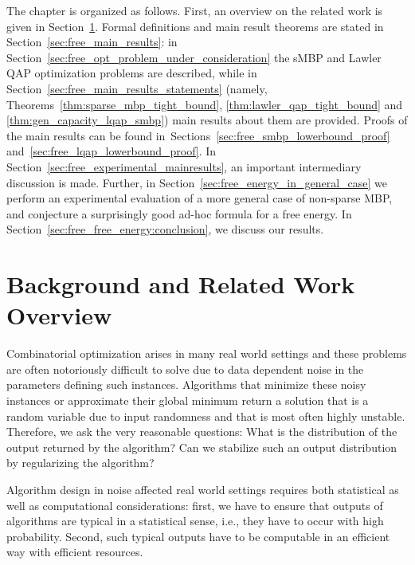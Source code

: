 The chapter is organized as follows. First, an overview on the related work is
given in Section~\ref{sec:free_related_work}. Formal definitions and main result
theorems are stated in Section~\ref{sec:free_main_results}: in
Section~\ref{sec:free_opt_problem_under_consideration} the sMBP and Lawler QAP
optimization problems are described, while in
Section~\ref{sec:free_main_results_statements} (namely,
Theorems~\ref{thm:sparse_mbp_tight_bound}, \ref{thm:lawler_qap_tight_bound} and
\ref{thm:gen_capacity_lqap_smbp}) main results about them are provided. Proofs
of the main results can be found
in~Sections~\ref{sec:free_smbp_lowerbound_proof}
and~\ref{sec:free_lqap_lowerbound_proof}. In
Section~\ref{sec:free_experimental_mainresults}, an important intermediary
discussion is made. Further, in Section~\ref{sec:free_energy_in_general_case} we
perform an experimental evaluation of a more general case of non-sparse MBP, and
conjecture a surprisingly good ad-hoc formula for a free energy. In
Section~\ref{sec:free_free_energy:conclusion}, we discuss our results.

\section{Background and Related Work Overview}
\label{sec:free_related_work}

Combinatorial optimization arises in many real world settings and
these problems are often notoriously difficult to solve due to data
dependent noise in the parameters defining such instances.  Algorithms
that minimize these noisy instances or approximate their global
minimum return a solution that is a random variable due to input
randomness and that is most often highly unstable. Therefore, we 
ask the very reasonable questions: What is the distribution of the
output returned by the algorithm? Can we stabilize such an output
distribution by regularizing the algorithm?

Algorithm design in noise affected real world settings requires both
statistical as well as computational considerations: first, we have to
ensure that outputs of algorithms are typical in a statistical sense,
i.e., they have to occur with high probability. Second, such typical
outputs have to be computable in an efficient way with efficient
resources. 

